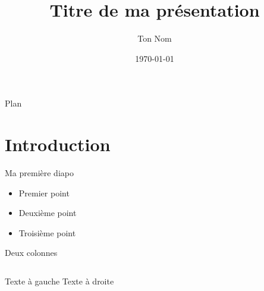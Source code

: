 \documentclass{beamer}
\title{Titre de ma présentation}
\author{Ton Nom}
\date{\today}
\begin{document}
\begin{frame}
  \titlepage
\end{frame}

\begin{frame}{Plan}
  \tableofcontents
\end{frame}

\section{Introduction}
\begin{frame}{Ma première diapo}
  \begin{itemize}
    \item Premier point
    \item Deuxième point
    \item Troisième point
  \end{itemize}
\end{frame}

\begin{frame}{Deux colonnes}
  \begin{columns}
      Texte à gauche
      Texte à droite
  \end{columns}
\end{frame}
\end{document}
